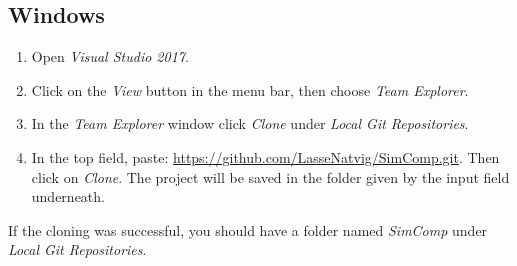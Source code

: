 \subsection{Windows}
\begin{enumerate}
    \item Open \textit{Visual Studio 2017}.
    \item Click on the \textit{View} button in the menu bar, then choose \textit{Team Explorer}.
    \item In the \textit{Team Explorer} window click \textit{Clone} under  \textit{Local Git Repositories}.
    \item In the top field, paste: \url{https://github.com/LasseNatvig/SimComp.git}. Then click on \textit{Clone}. The project will be saved in the folder given by the input field underneath.
\end{enumerate}
If the cloning was successful, you should have a folder named \textit{SimComp} under \textit{Local Git Repositories}.
